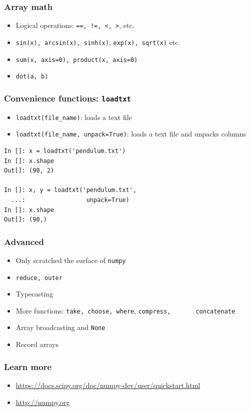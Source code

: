 \documentclass[14pt,compress]{beamer}
\newcounter{time}
\newcommand{\inctime}[1]{\addtocounter{time}{#1}{\tiny \thetime\ m}}
\newcommand{\typ}[1]{\lstinline{#1}}
\newcommand{\num}{\texttt{numpy}}
\begin{document}
\begin{frame}[fragile]
  \frametitle{Array math}
  \begin{itemize}
  \item Logical operations: \typ{==, !=, <, >}, etc.
  \item \typ{sin(x), arcsin(x), sinh(x)},
      \typ{exp(x), sqrt(x)} etc.
  \item \typ{sum(x, axis=0), product(x, axis=0)}
  \item \typ{dot(a, b)}
  \end{itemize}
\end{frame}

\begin{frame}[fragile]
    \frametitle{Convenience functions: \typ{loadtxt}}
  \begin{itemize}
      \item \typ{loadtxt(file_name)}: loads a text file
      \item \typ{loadtxt(file_name, unpack=True)}: loads a text file and
          unpacks columns
  \end{itemize}
  \begin{lstlisting}
In []: x = loadtxt('pendulum.txt')
In []: x.shape
Out[]: (90, 2)

In []: x, y = loadtxt('pendulum.txt',
  ...:                 unpack=True)
In []: x.shape
Out[]: (90,)
  \end{lstlisting}

  \inctime{10}
\end{frame}


\begin{frame}[fragile]
  \frametitle{Advanced}
  \begin{itemize}
  \item Only scratched the surface of \num
  \item \typ{reduce, outer}
  \item Typecasting
  \item More functions: \typ{take, choose, where}, \typ{compress,
      concatenate}
  \item Array broadcasting and \typ{None}
  \item Record arrays
  \end{itemize}
\end{frame}

\begin{frame}[fragile]
  \frametitle{Learn more}
  \small
    \begin{itemize}
        \item \url{https://docs.scipy.org/doc/numpy-dev/user/quickstart.html}
        \item \url{http://numpy.org}
    \end{itemize}
\end{frame}
\end{document}
